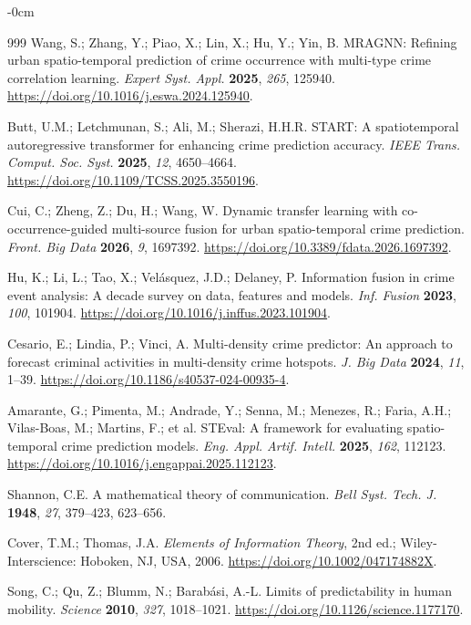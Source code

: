 \documentclass[applsci,article,submit,moreauthors]{Definitions/mdpi}
\begin{document}
\begin{adjustwidth}{-\extralength}{0cm}
\begin{thebibliography}{999}
Wang, S.; Zhang, Y.; Piao, X.; Lin, X.; Hu, Y.; Yin, B. MRAGNN: Refining urban spatio-temporal prediction of crime occurrence with multi-type crime correlation learning. \emph{Expert Syst. Appl.} \textbf{2025}, \emph{265}, 125940. \url{https://doi.org/10.1016/j.eswa.2024.125940}.

Butt, U.M.; Letchmunan, S.; Ali, M.; Sherazi, H.H.R. START: A
spatiotemporal autoregressive transformer for enhancing crime prediction
accuracy. \emph{IEEE Trans. Comput. Soc. Syst.} \textbf{2025}, \emph{12},
4650--4664. \url{https://doi.org/10.1109/TCSS.2025.3550196}.

Cui, C.; Zheng, Z.; Du, H.; Wang, W. Dynamic transfer learning with co-occurrence-guided multi-source fusion for urban spatio-temporal crime prediction. \emph{Front. Big Data} \textbf{2026}, \emph{9}, 1697392. \url{https://doi.org/10.3389/fdata.2026.1697392}.

Hu, K.; Li, L.; Tao, X.; Vel\'asquez, J.D.; Delaney, P. Information fusion in crime event analysis: A decade survey on data, features and models. \emph{Inf. Fusion} \textbf{2023}, \emph{100}, 101904. \url{https://doi.org/10.1016/j.inffus.2023.101904}.

Cesario, E.; Lindia, P.; Vinci, A. Multi-density crime predictor: An approach to forecast criminal activities in multi-density crime hotspots. \emph{J. Big Data} \textbf{2024}, \emph{11}, 1--39. \url{https://doi.org/10.1186/s40537-024-00935-4}.

Amarante, G.; Pimenta, M.; Andrade, Y.; Senna, M.; Menezes, R.; Faria, A.H.; Vilas-Boas, M.; Martins, F.; et al. STEval: A framework for evaluating spatio-temporal crime prediction models. \emph{Eng. Appl. Artif. Intell.} \textbf{2025}, \emph{162}, 112123. \url{https://doi.org/10.1016/j.engappai.2025.112123}.

Shannon, C.E. A mathematical theory of communication. \emph{Bell Syst. Tech. J.} \textbf{1948}, \emph{27}, 379--423, 623--656.

Cover, T.M.; Thomas, J.A. \emph{Elements of Information Theory}, 2nd ed.;
Wiley-Interscience: Hoboken, NJ, USA, 2006.
\url{https://doi.org/10.1002/047174882X}.

Song, C.; Qu, Z.; Blumm, N.; Barab\'asi, A.-L. Limits of predictability
in human mobility. \emph{Science} \textbf{2010}, \emph{327}, 1018--1021.
\url{https://doi.org/10.1126/science.1177170}.


\end{thebibliography}
\end{adjustwidth}
\end{document}
